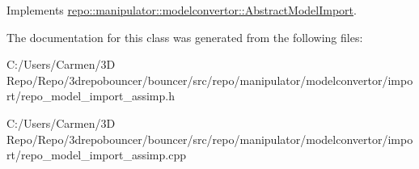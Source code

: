 Implements \hyperlink{classrepo_1_1manipulator_1_1modelconvertor_1_1_abstract_model_import_a2b6296ea483d39f7ce6fe1e8a78124fd}{repo\+::manipulator\+::modelconvertor\+::\+Abstract\+Model\+Import}.



The documentation for this class was generated from the following files\+:\begin{DoxyCompactItemize}
\item 
C\+:/\+Users/\+Carmen/3\+D Repo/\+Repo/3drepobouncer/bouncer/src/repo/manipulator/modelconvertor/import/repo\+\_\+model\+\_\+import\+\_\+assimp.\+h\item 
C\+:/\+Users/\+Carmen/3\+D Repo/\+Repo/3drepobouncer/bouncer/src/repo/manipulator/modelconvertor/import/repo\+\_\+model\+\_\+import\+\_\+assimp.\+cpp\end{DoxyCompactItemize}
